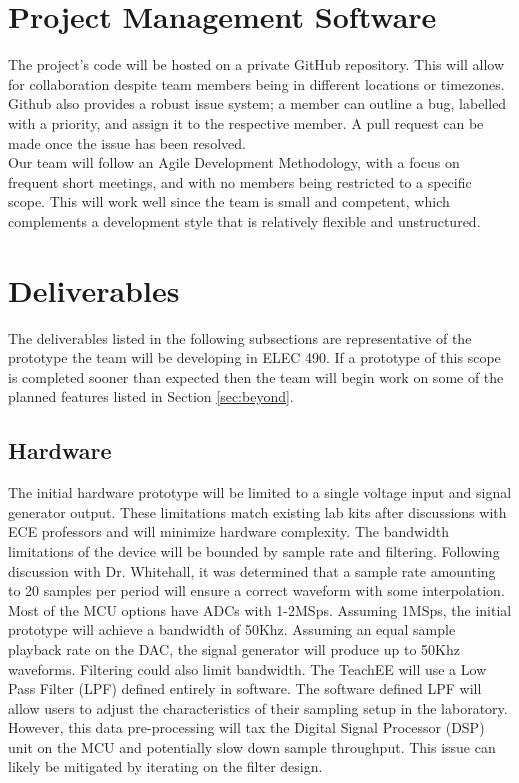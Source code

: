\documentclass[letterpaper,12pt]{article}
\begin{document}
\section{Project Management Software} %
The project's code will be hosted on a private GitHub repository. This will
allow for collaboration despite team members being in different locations or
timezones. Github also provides a robust issue system; a member can outline a
bug, labelled with a priority, and assign it to the respective member. A pull
request can be made once the issue has been resolved.\\

\noindent
Our team will follow an Agile Development Methodology, with a focus on frequent
short meetings, and with no members being restricted to a specific scope. This
will work well since the team is small and competent, which complements a
development style that is relatively flexible and unstructured.


\section{Deliverables}
The deliverables listed in the following subsections are representative of the
prototype the team will be developing in ELEC 490. If a prototype of this scope
is completed sooner than expected then the team will begin work on some of the
planned features listed in Section \ref{sec:beyond}.

\subsection{Hardware}
The initial hardware prototype will be limited to a single voltage input and
signal generator output. These limitations match existing lab kits after
discussions with ECE professors and will minimize hardware complexity. The
bandwidth limitations of the device will be bounded by sample rate and
filtering. Following discussion with Dr. Whitehall, it was determined that a
sample rate amounting to 20 samples per period will ensure a correct waveform
with some interpolation. Most of the MCU options have ADCs with 1-2MSps.
Assuming 1MSps, the initial prototype will achieve a bandwidth of 50Khz.
Assuming an equal sample playback rate on the DAC, the signal generator will
produce up to 50Khz waveforms. Filtering could also limit bandwidth. The TeachEE
will use a Low Pass Filter (LPF) defined entirely in software. The software
defined LPF will allow users to adjust the characteristics of their sampling
setup in the laboratory. However, this data pre-processing will tax the Digital
Signal Processor (DSP) unit on the MCU and potentially slow down sample
throughput. This issue can likely be mitigated by iterating on the filter
design.
\end{document}
